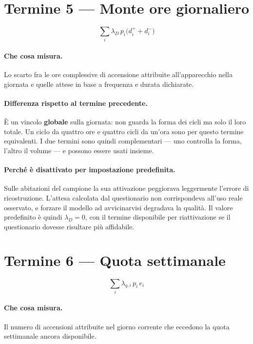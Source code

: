 \section{Termine 5 --- Monte ore giornaliero}

\begin{equation}
  \sum_{i} \lambda_D \, p_i \bigl( d^{+}_i + d^{-}_i \bigr)
\end{equation}

\paragraph{Che cosa misura.} Lo scarto fra le ore complessive di accensione attribuite
all'apparecchio nella giornata e quelle attese in base a frequenza e durata dichiarate.

\paragraph{Differenza rispetto al termine precedente.} È un vincolo \textbf{globale} sulla
giornata: non guarda la forma dei cicli ma solo il loro totale. Un ciclo da quattro ore e quattro
cicli da un'ora sono per questo termine equivalenti. I due termini sono quindi complementari ---
uno controlla la forma, l'altro il volume --- e possono essere usati insieme.

\paragraph{Perché è disattivato per impostazione predefinita.} Sulle abitazioni del campione la sua
attivazione peggiorava leggermente l'errore di ricostruzione. L'attesa calcolata dal questionario
non corrispondeva all'uso reale osservato, e forzare il modello ad avvicinarvisi degradava la
qualità. Il valore predefinito è quindi $\lambda_D = 0$, con il termine disponibile per
riattivazione se il questionario dovesse risultare più affidabile.

\section{Termine 6 --- Quota settimanale}
\label{sec:t-quota}

\begin{equation}
  \sum_{i} \lambda_{q,i} \, p_i \, e_i
\end{equation}

\paragraph{Che cosa misura.} Il numero di accensioni attribuite nel giorno corrente che eccedono la
quota settimanale ancora disponibile.

